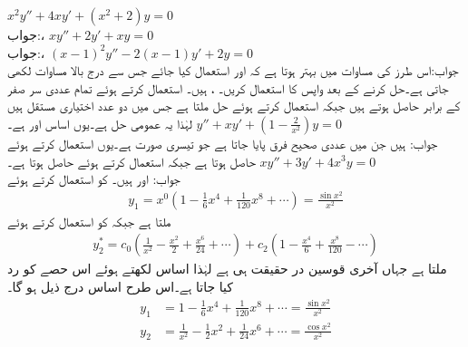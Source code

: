 \quad
$x^2y''+4xy'+(x^2+2)y=0$\\
جواب:، 
\quad
$xy''+2y'+xy=0$\\
جواب:، 
\quad 
$(x-1)^2y''-2(x-1)y'+2y=0$\\
جواب:اس طرز کی مساوات میں بہتر ہوتا ہے کہ  اور  استعمال کیا جائے جس سے درج بالا مساوات  لکھی جاتی ہے۔حل کرنے کے بعد واپس  کا استعمال کریں۔ 
،  ہیں۔ استعمال کرتے ہوئے تمام عددی سر صفر کے برابر حاصل ہوتے ہیں جبکہ  استعمال کرتے ہوئے حل  ملتا ہے جس میں دو عدد اختیاری مستقل ہیں لہٰذا یہ عمومی حل ہے۔یوں اساس  اور  ہے۔
\quad
$y''+xy'+(1-\frac{2}{x^2})y=0$\\
جواب:  ہیں جن میں عددی صحیح فرق پایا جاتا ہے جو تیسری صورت ہے۔یوں  استعمال کرتے ہوئے    حاصل ہوتا ہے جبکہ  استعمال کرتے ہوئے  حاصل ہوتا ہے۔
\quad
$xy''+3y'+4x^3y=0$\\
جواب: اور  ہیں۔  کو استعمال کرتے ہوئے
\begin{align*}
y_1=x^{0}(1-\tfrac{1}{6}x^4+\tfrac{1}{120}x^8+\cdots)=\tfrac{\sin x^2}{x^2}
\end{align*}
ملتا ہے جبکہ  کو استعمال کرتے ہوئے
\begin{align*}
y^*_2=c_0(\frac{1}{x^2}-\frac{x^2}{2}+\frac{x^6}{24}+\cdots)+c_2(1-\frac{x^4}{6}+\frac{x^8}{120}-\cdots)
\end{align*}
ملتا ہے جہاں آخری قوسین در حقیقت  ہی ہے لہٰذا اساس لکھتے ہوئے اس حصے کو رد کیا جاتا ہے۔اس طرح اساس درج ذیل ہو گا۔
\begin{align*}
y_1&=1-\tfrac{1}{6}x^4+\tfrac{1}{120}x^8+\cdots=\tfrac{\sin x^2}{x^2}\\
y_2&=\frac{1}{x^2}-\tfrac{1}{2}x^2+\tfrac{1}{24}x^6+\cdots=\tfrac{\cos x^2}{x^2}
\end{align*}
